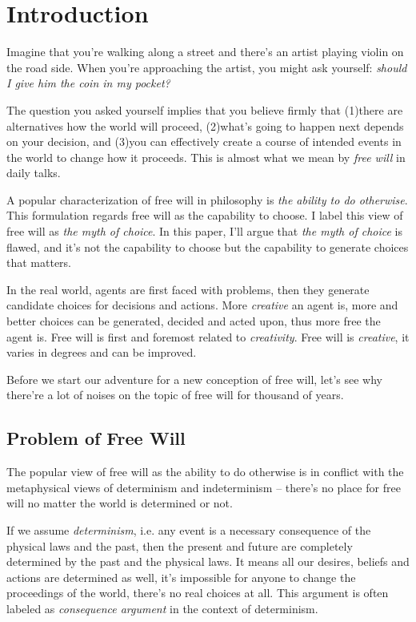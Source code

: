 \section{Introduction}

Imagine that you're walking along a street and there's an artist playing violin on the road side. When you're approaching the artist, you might ask yourself: \emph{should I give him the coin in my pocket?}

The question you asked yourself implies that you believe firmly that (1)there are alternatives how the world will proceed, (2)what's going to happen next depends on your decision, and (3)you can effectively create a course of intended events in the world to change how it proceeds. This is almost what we mean by \emph{free will} in daily talks.

A popular characterization of free will in philosophy is \emph{the ability to do otherwise}\cite{sep-freewill}. This formulation regards free will as the capability to choose. I label this view of free will as \emph{the myth of choice}. In this paper, I'll argue that \emph{the myth of choice} is flawed, and it's not the capability to choose but the capability to generate choices that matters.

In the real world, agents are first faced with problems, then they generate candidate choices for decisions and actions. More \emph{creative} an agent is, more and better choices can be generated, decided and acted upon, thus more free the agent is. Free will is first and foremost related to \emph{creativity}. Free will is \emph{creative}, it varies in degrees and can be improved.

Before we start our adventure for a new conception of free will, let's see why there're a lot of noises on the topic of free will for thousand of years.

\subsection{Problem of Free Will}

The popular view of free will as the ability to do otherwise is in conflict with the metaphysical views of determinism and indeterminism -- there’s no place for free will no matter the world is determined or not.

If we assume \emph{determinism}, i.e. any event is a necessary consequence of the physical laws and the past, then the present and future are completely determined by the past and the physical laws. It means all our desires, beliefs and actions are determined as well, it’s impossible for anyone to change the proceedings of the world, there’s no real choices at all. This argument is often labeled as \emph{consequence argument} in the context of determinism.

